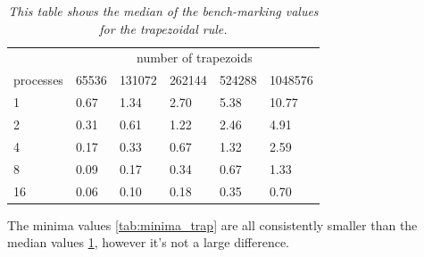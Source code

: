 \documentclass[a4paper,11pt,twoside]{article}
\begin{document}
\begin{table}[]
\centering
\caption{\textit{This table shows the median of the bench-marking values for the trapezoidal rule.}}
\label{tab:median_trap}
\begin{tabular}{llllll}
\multicolumn{1}{l|}{}          & \multicolumn{5}{c}{number of trapezoids}                                                                                       \\ \cline{2-6} 
\multicolumn{1}{l|}{processes} & \multicolumn{1}{l|}{65536} & \multicolumn{1}{l|}{131072} & \multicolumn{1}{l|}{262144} & \multicolumn{1}{l|}{524288} & 1048576 \\ \hline
1                              & 0.67                       & 1.34                        & 2.70                        & 5.38                        & 10.77   \\
2                              & 0.31                       & 0.61                        & 1.22                        & 2.46                        & 4.91    \\
4                              & 0.17                       & 0.33                        & 0.67                        & 1.32                        & 2.59    \\
8                              & 0.09                       & 0.17                        & 0.34                        & 0.67                        & 1.33    \\
16                             & 0.06                       & 0.10                        & 0.18                        & 0.35                        & 0.70   
\end{tabular}
\end{table}

The minima values \ref{tab:minima_trap} are all consistently smaller than the median values \ref{tab:median_trap}, however it's not a large difference. 
\end{document}
